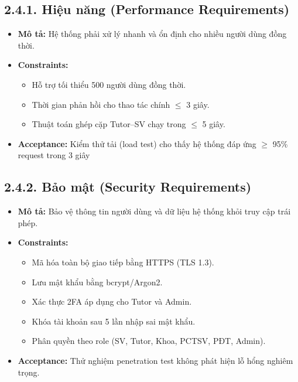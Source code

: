 \subsection*{2.4.1. Hiệu năng (Performance Requirements)}
\begin{itemize}
    \item \textbf{Mô tả:} Hệ thống phải xử lý nhanh và ổn định cho nhiều người dùng đồng thời.
    \item \textbf{Constraints:}
    \begin{itemize}
        \item Hỗ trợ tối thiểu 500 người dùng đồng thời.
        \item Thời gian phản hồi cho thao tác chính $\leq$ 3 giây.
        \item Thuật toán ghép cặp Tutor–SV chạy trong $\leq$ 5 giây.
    \end{itemize}
    \item \textbf{Acceptance:} Kiểm thử tải (load test) cho thấy hệ thống đáp ứng $\geq$ 95\% request trong 3 giây
\end{itemize}


\subsection*{2.4.2. Bảo mật (Security Requirements)}
\begin{itemize}
    \item \textbf{Mô tả:} Bảo vệ thông tin người dùng và dữ liệu hệ thống khỏi truy cập trái phép.
    \item \textbf{Constraints:}
    \begin{itemize}
        \item Mã hóa toàn bộ giao tiếp bằng HTTPS (TLS 1.3).
        \item Lưu mật khẩu bằng bcrypt/Argon2.
        \item Xác thực 2FA áp dụng cho Tutor và Admin. 
        \item Khóa tài khoản sau 5 lần nhập sai mật khẩu.
        \item Phân quyền theo role (SV, Tutor, Khoa, PCTSV, PĐT, Admin).
    \end{itemize}
    \item \textbf{Acceptance:} Thử nghiệm penetration test không phát hiện lỗ hổng nghiêm trọng.
\end{itemize}

